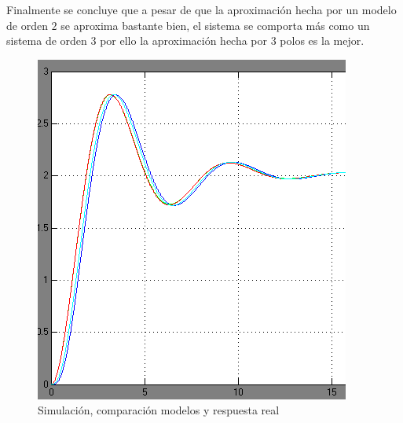 \documentclass[twocolumn]{IEEEtran}
\begin{document}
Finalmente se concluye que a pesar de que la aproximación hecha por un modelo de orden $2$ se aproxima bastante bien, el sistema se comporta más como un sistema de orden $3$ por ello la aproximación hecha por $3$ polos es la mejor.
\begin{figure}[H]
	\centering
		\includegraphics[scale=0.5]{figure17.png}
	\caption{Simulación, comparación modelos y respuesta real}
	\label{fig17}
\end{figure}
\end{document}
